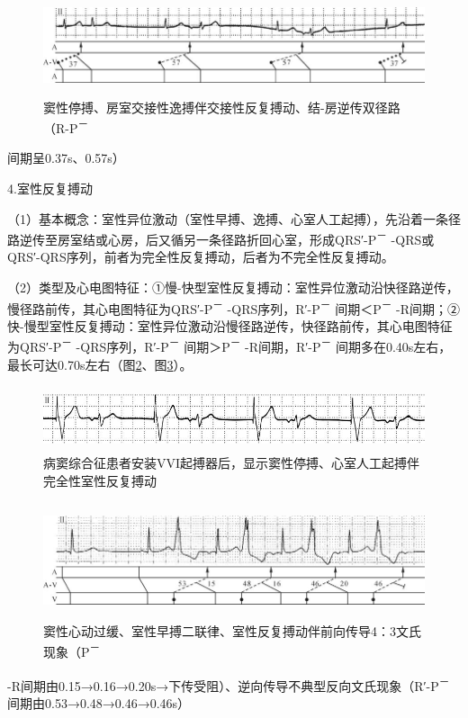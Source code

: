 \begin{figure}[!htbp]
 \centering
 \includegraphics[width=5.78125in,height=1.14583in]{./images/Image00254.jpg}
 \captionsetup{justification=centering}
 \caption{窦性停搏、房室交接性逸搏伴交接性反复搏动、结-房逆传双径路（R-P\textsuperscript{－}}
 \label{fig14-8}
  \end{figure} 
间期呈0.37s、0.57s）

4.室性反复搏动

（1）基本概念：室性异位激动（室性早搏、逸搏、心室人工起搏），先沿着一条径路逆传至房室结或心房，后又循另一条径路折回心室，形成QRS′-P\textsuperscript{－}
-QRS或QRS′-QRS序列，前者为完全性反复搏动，后者为不完全性反复搏动。

（2）类型及心电图特征：①慢-快型室性反复搏动：室性异位激动沿快径路逆传，慢径路前传，其心电图特征为QRS′-P\textsuperscript{－}
-QRS序列，R′-P\textsuperscript{－} 间期＜P\textsuperscript{－}
-R间期；②快-慢型室性反复搏动：室性异位激动沿慢径路逆传，快径路前传，其心电图特征为QRS′-P\textsuperscript{－}
-QRS序列，R′-P\textsuperscript{－} 间期＞P\textsuperscript{－}
-R间期，R′-P\textsuperscript{－}
间期多在0.40s左右，最长可达0.70s左右（图\ref{fig14-9}、图\ref{fig14-10}）。

\begin{figure}[!htbp]
 \centering
 \includegraphics[width=5.58333in,height=0.73958in]{./images/Image00255.jpg}
 \captionsetup{justification=centering}
 \caption{病窦综合征患者安装VVI起搏器后，显示窦性停搏、心室人工起搏伴完全性室性反复搏动}
 \label{fig14-9}
  \end{figure} 

\begin{figure}[!htbp]
 \centering
 \includegraphics[width=5.78125in,height=1.34375in]{./images/Image00256.jpg}
 \captionsetup{justification=centering}
 \caption{窦性心动过缓、室性早搏二联律、室性反复搏动伴前向传导4：3文氏现象（P\textsuperscript{－}}
 \label{fig14-10}
  \end{figure} 
-R间期由0.15→0.16→0.20s→下传受阻）、逆向传导不典型反向文氏现象（R′-P\textsuperscript{－}
间期由0.53→0.48→0.46→0.46s）

